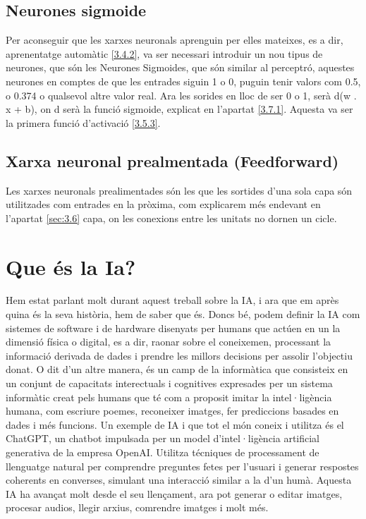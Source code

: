 \subsection{Neurones sigmoide}
Per aconseguir que les xarxes neuronals aprenguin per elles mateixes, es a dir, aprenentatge automàtic \ref{3.4.2}, va ser necessari introduir un nou tipus de neurones, que són les Neurones Sigmoides, que són similar al perceptró, aquestes neurones en comptes de que les entrades siguin 1 o 0, puguin tenir valors com 0.5, o 0.374 o qualsevol altre valor real. Ara les sorides en lloc de ser 0 o 1, serà d(w . x + b), on d serà la funció sigmoide, explicat en l'apartat \ref{3.7.1}. Aquesta va ser la primera funció d'activació \ref{3.5.3}.

\subsection{Xarxa neuronal prealmentada (Feedforward)}
Les xarxes neuronals prealimentades són les que les sortides d'una sola capa són utilitzades com entrades en la pròxima, com explicarem més endevant en l'apartat \ref{sec:3.6} capa, on les conexions entre les unitats no dornen un cicle.

\section{Que és la Ia?}
Hem estat parlant molt durant aquest treball sobre la IA, i ara que em après quina és la seva història, hem de saber que és. Doncs bé, podem definir la IA com sistemes de software i de hardware disenyats per humans que actúen en un la dimensió física o digital, es a dir, raonar sobre el coneixemen, processant la informació derivada de dades i prendre les millors decisions per assolir l'objectiu donat. O dit d'un altre manera, és un camp de la informàtica que consisteix en un conjunt de capacitats interectuals i cognitives expresades per un sistema informàtic creat pels humans que té com a proposit imitar la intel·ligència humana, com escriure poemes, reconeixer imatges, fer prediccions basades en dades i més funcions. Un exemple de IA i que tot el món coneix i utilitza és el ChatGPT, un chatbot impulsada per un model d'intel·ligència artificial generativa de la empresa OpenAI. Utilitza técniques de processament de llenguatge natural per comprendre preguntes fetes per l'usuari i generar respostes coherents en converses, simulant una interacció similar a la d'un humà. Aquesta IA ha avançat molt desde el seu llençament, ara pot generar o editar imatges, procesar audios, llegir arxius, comrendre imatges i molt més.

